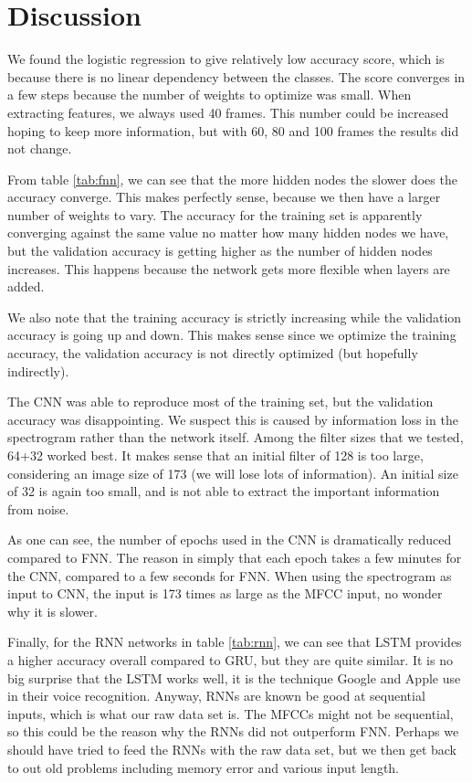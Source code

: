 \section{Discussion} \label{sec:discussion}
We found the logistic regression to give relatively low accuracy score, which is because there is no linear dependency between the classes. The score converges in a few steps because the number of weights to optimize was small. When extracting features, we always used 40 frames. This number could be increased hoping to keep more information, but with 60, 80 and 100 frames the results did not change. 

From table \eqref{tab:fnn}, we can see that the more hidden nodes the slower does the accuracy converge. This makes perfectly sense, because we then have a larger number of weights to vary. The accuracy for the training set is apparently converging against the same value no matter how many hidden nodes we have, but the validation accuracy is getting higher as the number of hidden nodes increases. This happens because the network gets more flexible when layers are added. 

We also note that the training accuracy is strictly increasing while the validation accuracy is going up and down. This makes sense since we optimize the training accuracy, the validation accuracy is not directly optimized (but hopefully indirectly). 

The CNN was able to reproduce most of the training set, but the validation accuracy was disappointing. We suspect this is caused by information loss in the spectrogram rather than the network itself. Among the filter sizes that we tested, 64+32 worked best. It makes sense that an initial filter of 128 is too large, considering an image size of 173 (we will lose lots of information). An initial size of 32 is again too small, and is not able to extract the important information from noise. 

As one can see, the number of epochs used in the CNN is dramatically reduced compared to FNN. The reason in simply that each epoch takes a few minutes for the CNN, compared to a few seconds for FNN. When using the spectrogram as input to CNN, the input is 173 times as large as the MFCC input, no wonder why it is slower. 

Finally, for the RNN networks in table \eqref{tab:rnn}, we can see that LSTM provides a higher accuracy overall compared to GRU, but they are quite similar. It is no big surprise that the LSTM works well, it is the technique Google and Apple use in their voice recognition. Anyway, RNNs are known be good at sequential inputs, which is what our raw data set is. The MFCCs might not be sequential, so this could be the reason why the RNNs did not outperform FNN. Perhaps we should have tried to feed the RNNs with the raw data set, but we then get back to out old problems including memory error and various input length. 

